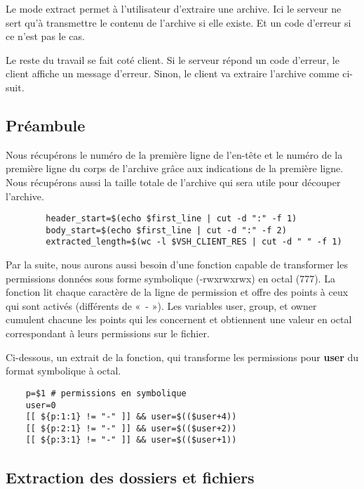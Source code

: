 \documentclass[titlepage]{article}
\begin{document}
	Le mode extract permet à l’utilisateur d’extraire une archive. Ici le serveur ne sert qu’à transmettre le contenu de l’archive si elle existe. Et un code d’erreur si ce n’est pas le cas. 

	Le reste du travail se fait coté client. Si le serveur répond un code d’erreur, le client affiche un message d’erreur. Sinon, le client va extraire l’archive comme ci-suit.

	\subsection{Préambule}

	Nous récupérons le numéro de la première ligne de l'en-tête et le numéro de la première ligne du corps de l'archive grâce aux indications de la première ligne. Nous récupérons aussi la taille totale de l’archive qui sera utile pour découper l'archive.

	\begin{lstlisting}
		header_start=$(echo $first_line | cut -d ":" -f 1)
		body_start=$(echo $first_line | cut -d ":" -f 2) 
		extracted_length=$(wc -l $VSH_CLIENT_RES | cut -d " " -f 1)
	\end{lstlisting}

	Par la suite, nous aurons aussi besoin d’une fonction capable de transformer les permissions données sous forme symbolique (-rwxrwxrwx) en octal (777). La fonction lit chaque caractère de la ligne de permission et offre des points à ceux qui sont activés (différents de « - »). Les variables user, group, et owner cumulent chacune les points qui les concernent et obtiennent une valeur en octal correspondant à leurs permissions sur le fichier. 

	Ci-dessous, un extrait de la fonction, qui transforme les permissions pour \textbf{user} du format symbolique à octal.

	\begin{lstlisting}
	p=$1 # permissions en symbolique
	user=0
	[[ ${p:1:1} != "-" ]] && user=$(($user+4))
	[[ ${p:2:1} != "-" ]] && user=$(($user+2))
	[[ ${p:3:1} != "-" ]] && user=$(($user+1))
	\end{lstlisting}

	\subsection{Extraction des dossiers et fichiers}
\end{document}
